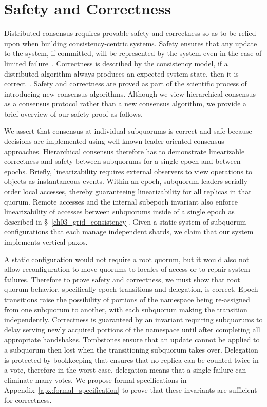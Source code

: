 \section{Safety and Correctness}
\label{ch03_safety}

Distributed consensus requires provable safety and correctness so as to be relied upon when building consistency-centric systems.
Safety ensures that any update to the system, if committed, will be represented by the system even in the case of limited failure~\cite{safety}.
Correctness is described by the consistency model, if a distributed algorithm always produces an expected system state, then it is correct~\cite{correctness}.
Safety and correctness are proved as part of the scientific process of introducing new consensus algorithms.
Although we view hierarchical consensus as a consensus protocol rather than a new consensus algorithm, we provide a brief overview of our safety proof as follows.

We assert that consensus at individual subquorums is correct and safe because decisions are implemented using well-known leader-oriented consensus approaches.
Hierarchical consensus therefore has to demonstrate linearizable correctness and safety between subquorums for a single epoch and between epochs.
Briefly, linearizability requires external observers to view operations to objects as instantaneous events.
Within an epoch, subquorum leaders serially order local accesses, thereby guaranteeing linearizability for all replicas in that quorum.
Remote accesses and the internal subepoch invariant also enforce linearizability of accesses between subquorums inside of a single epoch as described in \S~\ref{ch03_grid_consistency}.
Given a static system of subquorum configurations that each manage independent shards, we claim that our system implements vertical paxos.

A static configuration would not require a root quorum, but it would also not allow reconfiguration to move quorums to locales of access or to repair system failures.
Therefore to prove safety and correctness, we must show that root quorum behavior, specifically epoch transitions and delegation, is correct.
Epoch transitions raise the possibility of portions of the namespace being re-assigned from one subquorum to another, with each subquorum making the transition independently.
Correctness is guaranteed by an invariant requiring subquorums to delay serving newly acquired portions of the namespace until after completing all appropriate handshakes.
Tombstones ensure that an update cannot be applied to a subquorum then lost when the transitioning subquorum takes over.
Delegation is protected by bookkeeping that ensures that no replica can be counted twice in a vote, therefore in the worst case, delegation means that a single failure can eliminate many votes.
We propose formal specifications in Appendix~\ref{apx:formal_specification} to prove that these invariants are sufficient for correctness.

